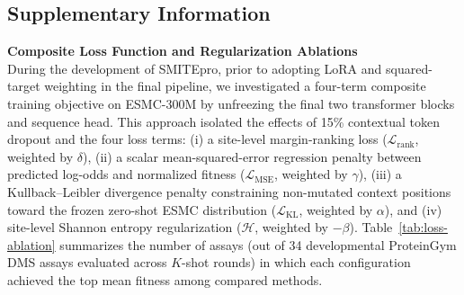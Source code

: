\documentclass[sn-nature]{sn-jnl}
\begin{document}
\newpage
\begin{appendices}

\section{Supplementary Information}\label{secA1}\label{secA2}\label{secA3}

\textbf{Composite Loss Function and Regularization Ablations} \\
During the development of SMITEpro, prior to adopting LoRA and squared-target weighting in the final pipeline, we investigated a four-term composite training objective on ESMC-300M by unfreezing the final two transformer blocks and sequence head. This approach isolated the effects of 15\% contextual token dropout and the four loss terms: (i) a site-level margin-ranking loss ($\mathcal{L}_{\text{rank}}$, weighted by $\delta$), (ii) a scalar mean-squared-error regression penalty between predicted log-odds and normalized fitness ($\mathcal{L}_{\text{MSE}}$, weighted by $\gamma$), (iii) a Kullback--Leibler divergence penalty constraining non-mutated context positions toward the frozen zero-shot ESMC distribution ($\mathcal{L}_{\text{KL}}$, weighted by $\alpha$), and (iv) site-level Shannon entropy regularization ($\mathcal{H}$, weighted by $-\beta$). Table~\ref{tab:loss-ablation} summarizes the number of assays (out of 34 developmental ProteinGym DMS assays evaluated across $K$-shot rounds) in which each configuration achieved the top mean fitness among compared methods.


\end{appendices}
\end{document}
